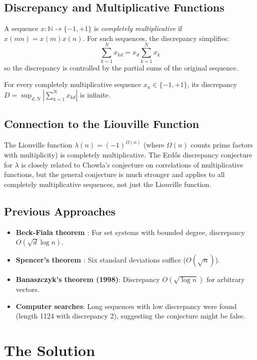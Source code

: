 \subsection{Discrepancy and Multiplicative Functions}
A sequence $x: \mathbb{N} \to \{-1, +1\}$ is \emph{completely multiplicative} if $x(mn) = x(m)x(n)$. For such sequences, the discrepancy simplifies:
\[
\sum_{k=1}^N x_{kd} = x_d \sum_{k=1}^N x_k
\]
so the discrepancy is controlled by the partial sums of the original sequence.

\begin{conjecture}
For every completely multiplicative sequence $x_n\in\{-1,+1\}$, its discrepancy $D=\sup_{d,N}\left|\sum_{k=1}^N x_{kd}\right|$ is infinite.
\end{conjecture}

\subsection{Connection to the Liouville Function}
The Liouville function $\lambda(n) = (-1)^{\Omega(n)}$ (where $\Omega(n)$ counts prime factors with multiplicity) is completely multiplicative. The Erdős discrepancy conjecture for $\lambda$ is closely related to Chowla's conjecture on correlations of multiplicative functions, but the general conjecture is much stronger and applies to all completely multiplicative sequences, not just the Liouville function.

\subsection{Previous Approaches}
\begin{itemize}
\item \textbf{Beck-Fiala theorem \cite{beckfiala1981}}: For set systems with bounded degree, discrepancy $O(\sqrt{d} \log n)$.
\item \textbf{Spencer's theorem \cite{spencer1985}}: Six standard deviations suffice ($O(\sqrt{n})$).
\item \textbf{Banaszczyk's theorem (1998)}: Discrepancy $O(\sqrt{\log n})$ for arbitrary vectors.
\item \textbf{Computer searches}: Long sequences with low discrepancy were found (length 1124 with discrepancy 2), suggesting the conjecture might be false.
\end{itemize}

\section{The Solution}

